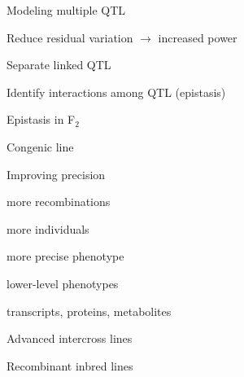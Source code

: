 \documentclass[12pt,t]{beamer}
\begin{document}
\begin{frame}[c]{Modeling multiple QTL}

\vspace{-20mm}

  \bbi
\item Reduce residual variation $\longrightarrow$ increased power
\item Separate linked QTL
\item Identify interactions among QTL {\lolit (epistasis)}
  \ei
\end{frame}





\begin{frame}[c]{Epistasis in F$_\text{2}$}


\end{frame}




\begin{frame}[c]{Congenic line}


\end{frame}



\begin{frame}[c]{Improving precision}

  \vspace{-20mm}

  \bbi
\item more recombinations
\item more individuals
\item more precise phenotype
\item lower-level phenotypes
\bi
\item transcripts, proteins, metabolites
  \ei
  \ei

\end{frame}



\begin{frame}[c]{Advanced intercross lines}


\end{frame}


\begin{frame}[c]{Recombinant inbred lines}


\end{frame}
\end{document}
